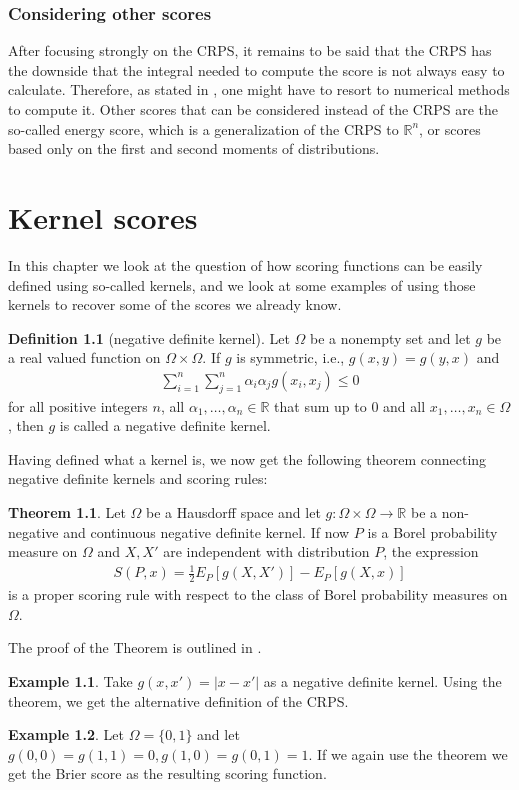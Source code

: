 \documentclass{def/tuberlin}
\theoremstyle{definition}
\newtheorem{definition}{Definition}[section]
\newtheorem{theorem}{Theorem}[section]
\newtheorem{example}{Example}[section]
\theoremstyle{remark}
\begin{document}
\subsection{Considering other scores}
After focusing strongly on the CRPS, it remains to be said that the CRPS has the downside that the integral needed to compute the score is not always easy to calculate. Therefore, as stated in \cite{Gneiting}, one might have to resort to numerical methods to compute it. Other scores that can be considered instead of the CRPS are the so-called energy score, which is a generalization of the CRPS to $\mathbb R^n$, or scores based only on the first and second moments of distributions.
\chapter{Kernel scores}
In this chapter we look at the question of how scoring functions can be easily defined using so-called kernels, and we look at some examples of using those kernels to recover some of the scores we already know.
\begin{definition}[negative definite kernel]
Let $\Omega$ be a nonempty set and let $g$ be a real valued function on $\Omega\times\Omega$. If $g$ is symmetric, i.e., $g(x,y)=g(y,x)$ and \begin{align*}
    \sum_{i=1}^n\sum_{j=1}^n \alpha_i\alpha_j g(x_i,x_j)\leq 0
\end{align*}
    for all positive integers $n$, all $\alpha_1,\dots,\alpha_n\in\mathbb R$ that sum up to $0$ and all $x_1,\dots,x_n\in\Omega$, then $g$ is called a negative definite kernel.
\end{definition}
Having defined what a kernel is, we now get the following theorem connecting negative definite kernels and scoring rules:
\begin{theorem}
Let $\Omega$ be a Hausdorff space and let $g\colon\Omega\times\Omega\to\mathbb R$ be a non-negative and continuous negative definite kernel. If now $P$ is a Borel probability measure on $\Omega$ and $X,X'$ are independent with distribution $P$, the expression \begin{align*}
    S(P,x)=\frac 12 E_P[g(X,X')]- E_P[g(X,x)]
\end{align*}
is a proper scoring rule with respect to the class of Borel probability measures on $\Omega$.
\end{theorem}
The proof of the Theorem is outlined in \cite{Gneiting}.
\begin{example}
    Take $g(x,x')=\lvert x-x'\rvert$ as a negative definite kernel. Using the theorem, we get the alternative definition of the CRPS.
\end{example}
\begin{example}
    Let $\Omega =\{0,1\}$ and let $g(0,0)=g(1,1)=0, g(1,0)=g(0,1)=1$. If we again use the theorem we get the Brier score as the resulting scoring function.
\end{example}
\end{document}
